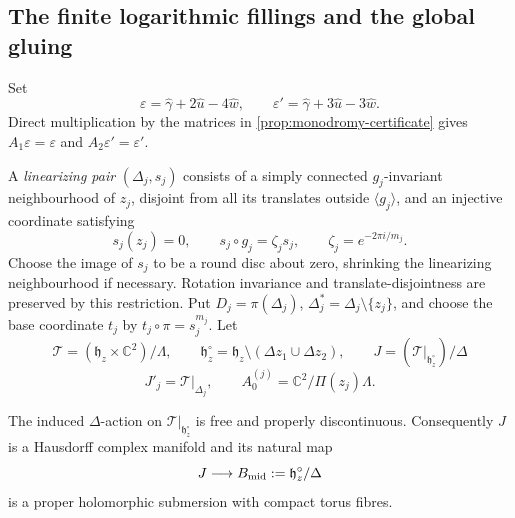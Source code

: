 \subsection{The finite logarithmic fillings and the global gluing}

Set
\[
 \varepsilon=\widehat\gamma+2\widehat u-4\widehat w,
 \qquad
 \varepsilon'=\widehat\gamma+3\widehat u-3\widehat w.
 \tag{2.8a}
\]
Direct multiplication by the matrices in
\cref{prop:monodromy-certificate} gives
\(A_1\varepsilon=\varepsilon\) and
\(A_2\varepsilon'=\varepsilon'\).

A \emph{linearizing pair} \((\Delta_j,s_j)\) consists of a simply connected
\(g_j\)-invariant neighbourhood of \(z_j\), disjoint from all its translates
outside \(\langle g_j\rangle\), and an injective coordinate satisfying
\[
 s_j(z_j)=0,\qquad s_j\circ g_j=\zeta_js_j,
 \qquad \zeta_j=e^{-2\pi i/m_j}.
 \tag{2.8b}
\]
Choose the image of \(s_j\) to be a round disc about zero, shrinking the
linearizing neighbourhood if necessary.  Rotation invariance and
translate-disjointness are preserved by this restriction.  Put
\(D_j=\pi(\Delta_j)\),
\(\Delta_j^*=\Delta_j\setminus\{z_j\}\), and choose the base coordinate
\(t_j\) by \(t_j\circ\pi=s_j^{m_j}\).  Let
\[
 \mathcal T=(\mathfrak h_z\times\mathbb C^2)/\Lambda,
 \qquad
 \mathfrak h_z^\circ=\mathfrak h_z\setminus
 (\Delta z_1\cup\Delta z_2),
 \qquad
 J=(\mathcal T|_{\mathfrak h_z^\circ})/\Delta
 \]
\[
 J'_j=\mathcal T|_{\Delta_j},
 \qquad
 A_0^{(j)}=\mathbb C^2/\Pi(z_j)\Lambda.
 \tag{2.8c}
\]

\begin{lemma}
\label{lem:middle-period-proper}
The induced \(\Delta\)-action on
\(\mathcal T|_{\mathfrak h_z^\circ}\) is free and properly discontinuous.
Consequently \(J\) is a Hausdorff complex manifold and its natural map
\[
 J\longrightarrow B_{\rm mid}:=\mathfrak h_z^\circ/\Delta
\]
is a proper holomorphic submersion with compact torus fibres.
\end{lemma}

